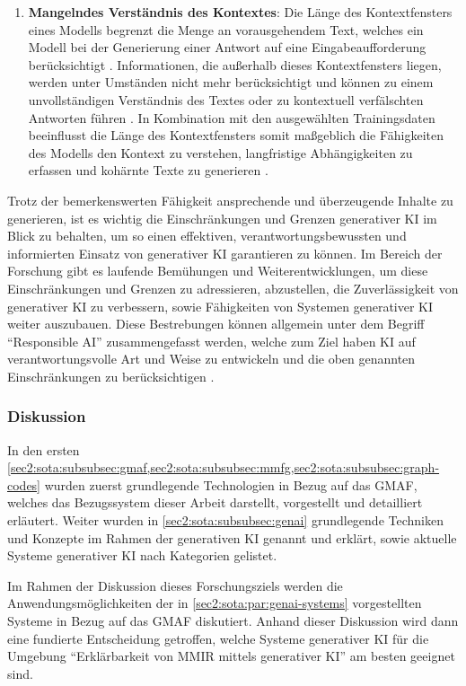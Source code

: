 \begin{enumerate}
    \item \textbf{Mangelndes Verständnis des Kontextes}:
    Die Länge des Kontextfensters eines Modells begrenzt die Menge an vorausgehendem Text, welches ein Modell bei der Generierung einer Antwort auf eine Eingabeaufforderung berücksichtigt \cite{v7labs-llm-limitations}.
    Informationen, die außerhalb dieses Kontextfensters liegen, werden unter Umständen nicht mehr berücksichtigt und können zu einem unvollständigen Verständnis des Textes oder zu kontextuell verfälschten Antworten führen \cite{v7labs-llm-limitations}.
    In Kombination mit den ausgewählten Trainingsdaten beeinflusst die Länge des Kontextfensters somit maßgeblich die Fähigkeiten des Modells den Kontext zu verstehen, langfristige Abhängigkeiten zu erfassen und kohärnte Texte zu generieren \cite{v7labs-llm-limitations}.
\end{enumerate}

Trotz der bemerkenswerten Fähigkeit ansprechende und überzeugende Inhalte zu generieren, ist es wichtig die Einschränkungen und Grenzen generativer KI im Blick zu behalten, um so einen effektiven, verantwortungsbewussten und informierten Einsatz von generativer KI garantieren zu können.
Im Bereich der Forschung gibt es laufende Bemühungen und Weiterentwicklungen, um diese Einschränkungen und Grenzen zu adressieren, abzustellen, die Zuverlässigkeit von generativer KI zu verbessern, sowie Fähigkeiten von Systemen generativer KI weiter auszubauen.
Diese Bestrebungen können allgemein unter dem Begriff \enquote{Responsible AI} zusammengefasst werden, welche zum Ziel haben KI auf verantwortungsvolle Art und Weise zu entwickeln und die oben genannten Einschränkungen zu berücksichtigen \cite{gabler-responsible-ai}.

\subsubsection{Diskussion}
\label{sec2:sota:subsubsec:fz1:discussion}
In den ersten {\cref{sec2:sota:subsubsec:gmaf,sec2:sota:subsubsec:mmfg,sec2:sota:subsubsec:graph-codes}} wurden zuerst grundlegende Technologien in Bezug auf das GMAF, welches das Bezugssystem dieser Arbeit darstellt, vorgestellt und detailliert erläutert.
Weiter wurden in \cref{sec2:sota:subsubsec:genai} grundlegende Techniken und Konzepte im Rahmen der generativen KI genannt und erklärt, sowie aktuelle Systeme generativer KI nach Kategorien gelistet.

Im Rahmen der Diskussion dieses Forschungsziels werden die Anwendungsmöglichkeiten der in \cref{sec2:sota:par:genai-systems} vorgestellten Systeme in Bezug auf das GMAF diskutiert.
Anhand dieser Diskussion wird dann eine fundierte Entscheidung getroffen, welche Systeme generativer KI für die Umgebung \enquote{Erklärbarkeit von MMIR mittels generativer KI} am besten geeignet sind.

